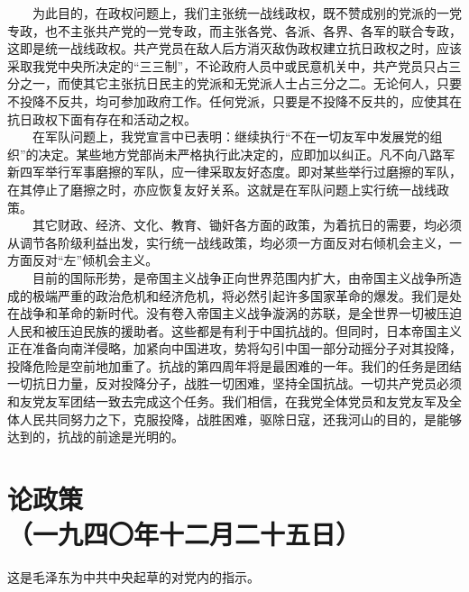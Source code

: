 \documentclass[cn,11pt,chinese]{elegantbook}
\def\myformat#1{\hfil\hfil #1}
\begin{document}
　　为此目的，在政权问题上，我们主张统一战线政权，既不赞成别的党派的一党专政，也不主张共产党的一党专政，而主张各党、各派、各界、各军的联合专政，这即是统一战线政权。共产党员在敌人后方消灭敌伪政权建立抗日政权之时，应该采取我党中央所决定的“三三制”，不论政府人员中或民意机关中，共产党员只占三分之一，而使其它主张抗日民主的党派和无党派人士占三分之二。无论何人，只要不投降不反共，均可参加政府工作。任何党派，只要是不投降不反共的，应使其在抗日政权下面有存在和活动之权。\\
　　在军队问题上，我党宣言中已表明：继续执行“不在一切友军中发展党的组织”的决定。某些地方党部尚未严格执行此决定的，应即加以纠正。凡不向八路军新四军举行军事磨擦的军队，应一律采取友好态度。即对某些举行过磨擦的军队，在其停止了磨擦之时，亦应恢复友好关系。这就是在军队问题上实行统一战线政策。\\
　　其它财政、经济、文化、教育、锄奸各方面的政策，为着抗日的需要，均必须从调节各阶级利益出发，实行统一战线政策，均必须一方面反对右倾机会主义，一方面反对“左”倾机会主义。\\
　　目前的国际形势，是帝国主义战争正向世界范围内扩大，由帝国主义战争所造成的极端严重的政治危机和经济危机，将必然引起许多国家革命的爆发。我们是处在战争和革命的新时代。没有卷入帝国主义战争漩涡的苏联，是全世界一切被压迫人民和被压迫民族的援助者。这些都是有利于中国抗战的。但同时，日本帝国主义正在准备向南洋侵略，加紧向中国进攻，势将勾引中国一部分动摇分子对其投降，投降危险是空前地加重了。抗战的第四周年将是最困难的一年。我们的任务是团结一切抗日力量，反对投降分子，战胜一切困难，坚持全国抗战。一切共产党员必须和友党友军团结一致去完成这个任务。我们相信，在我党全体党员和友党友军及全体人民共同努力之下，克服投降，战胜困难，驱除日寇，还我河山的目的，是能够达到的，抗战的前途是光明的。\\
\newpage\section*{\myformat{论政策}\\\myformat{（一九四〇年十二月二十五日）}}
\begin{introduction}\item  这是毛泽东为中共中央起草的对党内的指示。\end{introduction}
\end{document}
